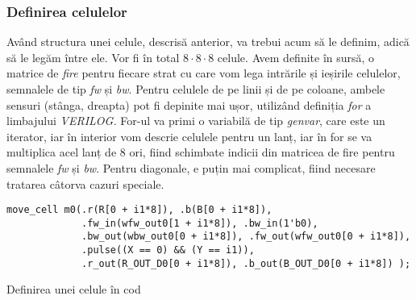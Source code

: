 \documentclass[12pt,twoside,a4paper,fleqn]{book}
\theoremstyle{definition}
\begin{document}
\subsubsection{Definirea celulelor}
Având structura unei celule, descrisă anterior, va trebui acum să le definim, adică să le legăm între ele. Vor fi în total $8 \cdot 8 \cdot 8$ celule. Avem definite în sursă, o matrice de \emph{fire} pentru fiecare strat cu care vom lega intrările și ieșirile celulelor, semnalele de tip \emph{fw} și \emph{bw}. Pentru celulele de pe linii și de pe coloane, ambele sensuri (stânga, dreapta) pot fi depinite mai ușor, utilizând definiția \emph{for} a limbajului \emph{VERILOG.} For-ul va primi o variabilă de tip \emph{genvar}, care este un iterator, iar în interior vom descrie celulele pentru un lanț, iar în for se va multiplica acel lanț de $8$ ori, fiind schimbate indicii din matricea de fire pentru semnalele \emph{fw} și \emph{bw}. Pentru diagonale, e puțin mai complicat, fiind necesare tratarea câtorva cazuri speciale.
\begin{fragmentsursa}
\begin{scriptsize}
\begin{verbatim}
move_cell m0(.r(R[0 + i1*8]), .b(B[0 + i1*8]), 
             .fw_in(wfw_out0[1 + i1*8]), .bw_in(1'b0), 
             .bw_out(wbw_out0[0 + i1*8]), .fw_out(wfw_out0[0 + i1*8]), 
             .pulse((X == 0) && (Y == i1)), 
             .r_out(R_OUT_D0[0 + i1*8]), .b_out(B_OUT_D0[0 + i1*8]) );
\end{verbatim}
\end{scriptsize}
\caption{Definirea unei celule în cod}
\label{m0}
\end{fragmentsursa}
\end{document}
